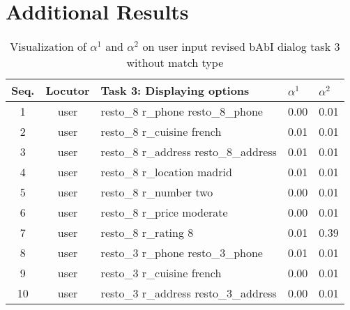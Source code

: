 \documentclass{article} \usepackage{iclr2018_conference,times}
\begin{document}
\section{Additional Results}\label{appendix:dialog_task3}


\begin{table}[h]
\centering
\caption{Visualization of $\alpha^1$ and $\alpha^2$ on user input revised bAbI dialog task 3 without match type}
\label{table:dialog_task3_add}
\begin{adjustbox}{max width=0.9\textwidth}
\begin{tabular}{|c|c|L{11cm}|C{1cm}|C{1cm}|}
\hline
Seq.           & Locutor           & Task 3: Displaying options                & $\alpha^1$                           & $\alpha^2$ \\               & user              & resto\_8 r\_phone resto\_8\_phone         & 0.00 & 0.01 \\
2              & user              & resto\_8 r\_cuisine french                & 0.01 & 0.01 \\
3              & user              & resto\_8 r\_address resto\_8\_address     & 0.01 & 0.01 \\
4              & user              & resto\_8 r\_location madrid               & 0.01 & 0.01 \\
5              & user              & resto\_8 r\_number two                    & 0.00 & 0.01 \\
6              & user              & resto\_8 r\_price moderate                & 0.00 & 0.01 \\
7              & user              & resto\_8 r\_rating 8                      & 0.01 & 0.39 \\
8              & user              & resto\_3 r\_phone resto\_3\_phone         & 0.01 & 0.01 \\
9              & user              & resto\_3 r\_cuisine french                & 0.00 & 0.01 \\
10             & user              & resto\_3 r\_address resto\_3\_address     & 0.00 & 0.01 \\

\end{tabular}
\end{adjustbox}
\end{table}
\end{document}
